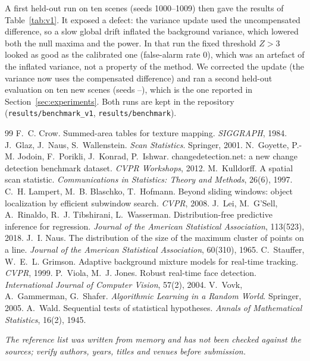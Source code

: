 \documentclass[11pt,a4paper]{article}
\theoremstyle{definition}
\begin{document}
A first held-out run on ten scenes (seeds 1000--1009) then gave the results of Table~\ref{tab:v1}.
It exposed a defect: the variance update used the uncompensated difference, so a slow global drift inflated the background variance, which lowered both the null maxima and the power.
In that run the fixed threshold $Z>3$ looked as good as the calibrated one (false-alarm rate $0$), which was an artefact of the inflated variance, not a property of the method.
We corrected the update (the variance now uses the compensated difference) and ran a second held-out evaluation on ten new scenes (seeds \seedLow--\seedHigh), which is the one reported in Section~\ref{sec:experiments}.
Both runs are kept in the repository (\texttt{results/benchmark\_v1}, \texttt{results/benchmark}).

\begin{table}[h]
\centering\small
\resizebox{\textwidth}{!}{}
\caption{First held-out run (seeds 1000--1009) with the variance defect. Compare the fixed-threshold row with Table~\ref{tab:detection}.}
\label{tab:v1}
\end{table}

\begin{thebibliography}{99}\small
{} F.~C. Crow. Summed-area tables for texture mapping. \emph{SIGGRAPH}, 1984.
 J.~Glaz, J.~Naus, S.~Wallenstein. \emph{Scan Statistics}. Springer, 2001.
 N.~Goyette, P.-M. Jodoin, F.~Porikli, J.~Konrad, P.~Ishwar. changedetection.net: a new change detection benchmark dataset. \emph{CVPR Workshops}, 2012.
 M.~Kulldorff. A spatial scan statistic. \emph{Communications in Statistics: Theory and Methods}, 26(6), 1997.
 C.~H. Lampert, M.~B. Blaschko, T.~Hofmann. Beyond sliding windows: object localization by efficient subwindow search. \emph{CVPR}, 2008.
 J.~Lei, M.~G'Sell, A.~Rinaldo, R.~J. Tibshirani, L.~Wasserman. Distribution-free predictive inference for regression. \emph{Journal of the American Statistical Association}, 113(523), 2018.
 J.~I. Naus. The distribution of the size of the maximum cluster of points on a line. \emph{Journal of the American Statistical Association}, 60(310), 1965.
 C.~Stauffer, W.~E.~L. Grimson. Adaptive background mixture models for real-time tracking. \emph{CVPR}, 1999.
 P.~Viola, M.~J. Jones. Robust real-time face detection. \emph{International Journal of Computer Vision}, 57(2), 2004.
 V.~Vovk, A.~Gammerman, G.~Shafer. \emph{Algorithmic Learning in a Random World}. Springer, 2005.
 A.~Wald. Sequential tests of statistical hypotheses. \emph{Annals of Mathematical Statistics}, 16(2), 1945.
\end{thebibliography}
\noindent\textit{The reference list was written from memory and has not been checked against the sources; verify authors, years, titles and venues before submission.}
\end{document}
